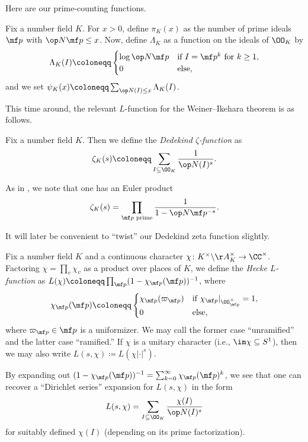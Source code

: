 \documentclass[../thesis.tex]{subfiles}
\begin{document}
Here are our prime-counting functions.
\begin{definition}
	Fix a number field $K$. For $x>0$, define $\pi_K(x)$ as the number of prime ideals $\mf p$ with $\op N\mf p\le x$. Now, define $\Lambda_K$ as a function on the ideals of $\OO_K$ by
	\[\Lambda_K(I)\coloneqq\begin{cases}
		\log\op N\mf p & \text{if }I=\mf p^k\text{ for }k\ge1, \\
		0 & \text{else},
	\end{cases}\]
	and we set $\psi_K(x)\coloneqq\sum_{\op N(I)\le x}\Lambda_K(I)$.
\end{definition}
This time around, the relevant $L$-function for the Weiner--Ikehara theorem is as follows.
\begin{definition}
	Fix a number field $K$. Then we define the \textit{Dedekind $\zeta$-function} as
	\[\zeta_K(s)\coloneqq\sum_{I\subseteq\OO_K}\frac1{\op N(I)^s}.\]
\end{definition}
\begin{remark}
	As in , we note that one has an Euler product
	\[\zeta_K(s)=\prod_{\mf p\text{ prime}}\frac1{1-\op N\mf p^{-s}}.\]
\end{remark}
It will later be convenient to ``twist'' our Dedekind zeta function slightly.
\begin{defihelper} 
	Fix a number field $K$ and a continuous character $\chi\colon K^\times\backslash\AA_K^\times\to\CC^\times$. Factoring $\chi=\prod_v\chi_v$ as a product over places of $K$, we define the \textit{Hecke $L$-function} as $L(\chi)\coloneqq\prod_{\mf p}(1-\chi_{\mf p}(\mf p))^{-1}$, where
	\[\chi_{\mf p}(\mf p)\coloneqq\begin{cases}
		\chi_{\mf p}(\varpi_{\mf p}) & \text{if }\chi_{\mf p}|_{\OO_{\mf p}^\times}=1, \\
		0 & \text{else},
	\end{cases}\]
	where $\varpi_{\mf p}\in\mf p$ is a uniformizer.
	We may call the former case ``unramified'' and the latter case ``ramified.'' If $\chi$ is a unitary character (i.e., $\im\chi\subseteq S^1$), then we may also write $L(s,\chi)\coloneqq L\left(\chi\left|\cdot\right|^s\right)$.
\end{defihelper}
\begin{remark} \label{rem:hecke-euler-prod}
	By expanding out $(1-\chi_{\mf p}(\mf p))^{-1}=\sum_{k=0}^\infty\chi_{\mf p}(\mf p)^k$, we see that one can recover a ``Dirichlet series'' expansion for $L(s,\chi)$ in the form
	\[L(s,\chi)=\sum_{I\subseteq\OO_K}\frac{\chi(I)}{\op N(I)^s}\]
	for suitably defined $\chi(I)$ (depending on its prime factorization).
\end{remark}
\end{document}
